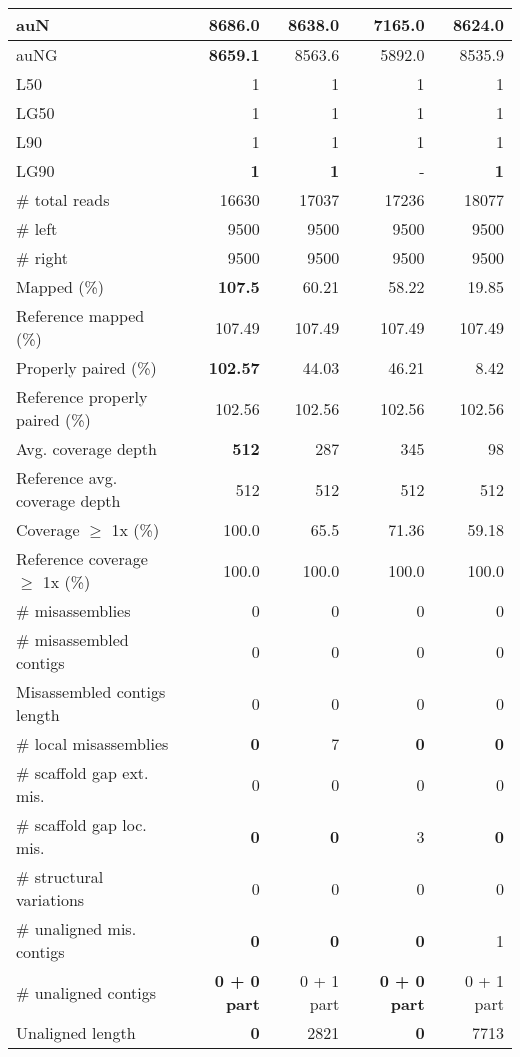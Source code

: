 \documentclass[12pt,a4paper]{article}
\begin{document}
\begin{table}[ht]
\begin{center}
\begin{tabular}{|l*{4}{|r}|}
auN & {\bf 8686.0} & 8638.0 & 7165.0 & 8624.0 \\ \hline
auNG & {\bf 8659.1} & 8563.6 & 5892.0 & 8535.9 \\ \hline
L50 & 1 & 1 & 1 & 1 \\ \hline
LG50 & 1 & 1 & 1 & 1 \\ \hline
L90 & 1 & 1 & 1 & 1 \\ \hline
LG90 & {\bf 1} & {\bf 1} & - & {\bf 1} \\ \hline
\# total reads & 16630 & 17037 & 17236 & 18077 \\ \hline
\# left & 9500 & 9500 & 9500 & 9500 \\ \hline
\# right & 9500 & 9500 & 9500 & 9500 \\ \hline
Mapped (\%) & {\bf 107.5} & 60.21 & 58.22 & 19.85 \\ \hline
Reference mapped (\%) & 107.49 & 107.49 & 107.49 & 107.49 \\ \hline
Properly paired (\%) & {\bf 102.57} & 44.03 & 46.21 & 8.42 \\ \hline
Reference properly paired (\%) & 102.56 & 102.56 & 102.56 & 102.56 \\ \hline
Avg. coverage depth & {\bf 512} & 287 & 345 & 98 \\ \hline
Reference avg. coverage depth & 512 & 512 & 512 & 512 \\ \hline
Coverage $\geq$ 1x (\%) & 100.0 & 65.5 & 71.36 & 59.18 \\ \hline
Reference coverage $\geq$ 1x (\%) & 100.0 & 100.0 & 100.0 & 100.0 \\ \hline
\# misassemblies & 0 & 0 & 0 & 0 \\ \hline
\# misassembled contigs & 0 & 0 & 0 & 0 \\ \hline
Misassembled contigs length & 0 & 0 & 0 & 0 \\ \hline
\# local misassemblies & {\bf 0} & 7 & {\bf 0} & {\bf 0} \\ \hline
\# scaffold gap ext. mis. & 0 & 0 & 0 & 0 \\ \hline
\# scaffold gap loc. mis. & {\bf 0} & {\bf 0} & 3 & {\bf 0} \\ \hline
\# structural variations & 0 & 0 & 0 & 0 \\ \hline
\# unaligned mis. contigs & {\bf 0} & {\bf 0} & {\bf 0} & 1 \\ \hline
\# unaligned contigs & {\bf 0 + 0 part} & 0 + 1 part & {\bf 0 + 0 part} & 0 + 1 part \\ \hline
Unaligned length & {\bf 0} & 2821 & {\bf 0} & 7713 \\ \hline

\end{tabular}
\end{center}
\end{table}
\end{document}
